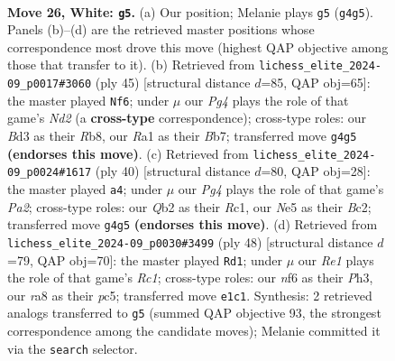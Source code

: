 \documentclass[11pt]{article}
\begin{document}
\clearpage

\begin{figure}[p]\centering
\begin{subfigure}{0.46\textwidth}\centering
\resizebox{\linewidth}{!}{%
\newchessgame
\chessboard[
  setfen={r2qb1k1/p4pp1/5n1p/p2pN3/1r4PP/1P1B4/PQ3P2/R3R1K1 w - - 0 26},
  showmover=false,
  pgfstyle=straightmove, color=movearrow, markmove={g4-g5}
]}
\caption{}
\end{subfigure}\hfill
\begin{subfigure}{0.46\textwidth}\centering
\resizebox{\linewidth}{!}{%
\newchessgame
\chessboard[
  setfen={1r2r1k1/pb1n1pp1/7p/6q1/3Ppn2/1NN1R3/PPQ2PPP/2R2BK1 b - - 11 23},
  showmover=false,
  pgfstyle=straightmove, color=movearrow, markmove={d7-f6}
]}
\caption{}
\end{subfigure}
\\[4pt]
\begin{subfigure}{0.46\textwidth}\centering
\resizebox{\linewidth}{!}{%
\newchessgame
\chessboard[
  setfen={2bqr1k1/1p3pp1/r1p2n1p/8/3Pp3/4P2P/P1BQNPP1/R1R3K1 w - - 0 21},
  showmover=false,
  pgfstyle=straightmove, color=movearrow, markmove={a2-a4}
]}
\caption{}
\end{subfigure}\hfill
\begin{subfigure}{0.46\textwidth}\centering
\resizebox{\linewidth}{!}{%
\newchessgame
\chessboard[
  setfen={6k1/1b3p1p/pp1q1np1/2pPr3/P7/2N4P/1P1Q1PP1/1BR3K1 w - - 2 25},
  showmover=false,
  pgfstyle=straightmove, color=movearrow, markmove={c1-d1}
]}
\caption{}
\end{subfigure}
\caption{\textbf{Move 26, White: \texttt{g5}.} (a) Our position; Melanie plays \texttt{g5} (\texttt{g4g5}). Panels (b)--(d) are the retrieved master positions whose correspondence most drove this move (highest QAP objective among those that transfer to it). (b) Retrieved from \texttt{lichess\_elite\_2024-09\_p0017\#3060} (ply 45) [structural distance $d$=85, QAP obj=65]: the master played \texttt{Nf6}; under $\mu$ our \emph{Pg4} plays the role of that game's \emph{Nd2} (a \textbf{cross-type} correspondence); cross-type roles: our \emph{B}d3 as their \emph{R}b8, our \emph{R}a1 as their \emph{B}b7; transferred move \texttt{g4g5} \textbf{(endorses this move)}. (c) Retrieved from \texttt{lichess\_elite\_2024-09\_p0024\#1617} (ply 40) [structural distance $d$=80, QAP obj=28]: the master played \texttt{a4}; under $\mu$ our \emph{Pg4} plays the role of that game's \emph{Pa2}; cross-type roles: our \emph{Q}b2 as their \emph{R}c1, our \emph{N}e5 as their \emph{B}c2; transferred move \texttt{g4g5} \textbf{(endorses this move)}. (d) Retrieved from \texttt{lichess\_elite\_2024-09\_p0030\#3499} (ply 48) [structural distance $d$=79, QAP obj=70]: the master played \texttt{Rd1}; under $\mu$ our \emph{Re1} plays the role of that game's \emph{Rc1}; cross-type roles: our \emph{n}f6 as their \emph{P}h3, our \emph{r}a8 as their \emph{p}c5; transferred move \texttt{e1c1}. Synthesis: 2 retrieved analogs transferred to \texttt{g5} (summed QAP objective 93, the strongest correspondence among the candidate moves); Melanie committed it via the \texttt{search} selector.}
\label{fig:thought-m50}
\end{figure}
\end{document}
